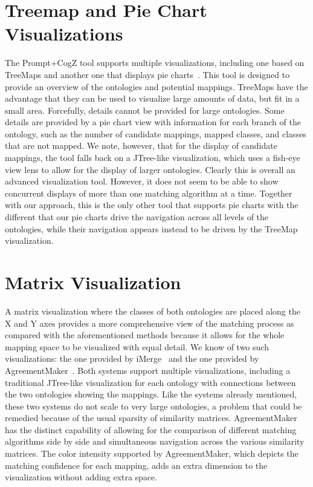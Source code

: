 \section{Treemap and Pie Chart Visualizations} %
\label{sub:treemap_view}
The {\sc Prompt+CogZ} tool supports multiple visualizations, including one based on TreeMaps and another one that displays pie charts~\cite{Falconer07}. This tool is designed to provide an overview of the ontologies and potential mappings. TreeMaps have the advantage that they can be used to visualize large amounts of data, but fit in a small area. Forcefully, details cannot be provided for large ontologies. Some details are provided by a pie chart view with information for each branch of the ontology, such as the number of candidate mappings, mapped classes, and classes that are not mapped. %
We note, however, that for the display of candidate mappings, the tool falls back on a JTree-like visualization, which uses a fish-eye view lens to allow for the display of larger ontologies. Clearly this is overall an advanced visualization tool. However, it does not seem to be able to show concurrent displays of more than one matching algorithm at a time.  Together with our approach, this is the only other tool that supports pie charts with the different that our pie charts drive the navigation across all levels of the ontologies, while their navigation appears instead to be driven by the TreeMap visualization.
\section{Matrix Visualization} %
\label{sub:matrix_representation}
A matrix visualization where the classes of both ontologies are placed along the X and Y axes provides a more comprehensive view of the matching process as compared with the aforementioned methods because it allows for the whole mapping space to be visualized with equal detail. We know of two such visualizations: the one provided by iMerge~\cite{iMerge} and the one provided by AgreementMaker~\cite{cruz-icde-demo}. Both systems support multiple visualizations, including a traditional JTree-like visualization for each ontology with connections between the two ontologies showing the mappings. 
Like the systems already mentioned, these two systems do not scale to very large ontologies, a problem that could be remedied because of the usual sparsity of similarity matrices. AgreementMaker has the distinct capability of allowing for the comparison of different matching algorithms side by side and simultaneous navigation across the various similarity matrices. The color intensity supported by AgreementMaker, which depicts the matching confidence for each mapping, adds an extra dimension to the visualization without adding extra space. 

